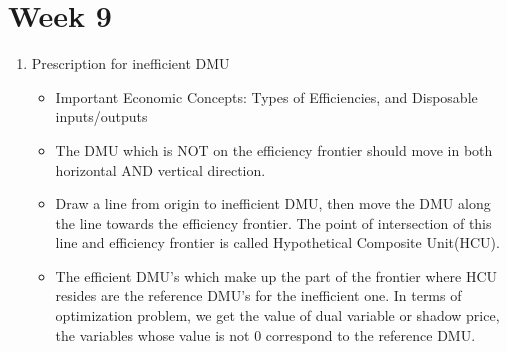 \documentclass[a4paper]{article}
\begin{document}
 \section{Week 9}
 \begin{enumerate}
     \item Prescription for inefficient DMU
     \begin{itemize}
        \item Important Economic Concepts: Types of Efficiencies, and Disposable inputs/outputs
         \item The DMU which is NOT on the efficiency frontier should move in both horizontal AND vertical direction.
         \item Draw a line from origin to inefficient DMU, then move the DMU along the line towards the efficiency frontier. The point of intersection of this line and efficiency frontier is called Hypothetical Composite Unit(HCU).
         \item The efficient DMU's which make up the part of the frontier where HCU resides are the reference DMU's for the inefficient one. In terms of optimization problem, we get the value of dual variable or shadow price, the variables whose value is not 0 correspond to the reference DMU.
     \end{itemize}
 \end{enumerate}
\end{document}
